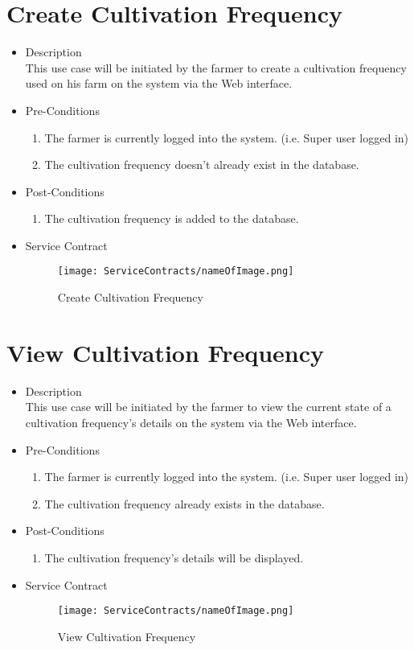\documentclass[11pt,fleqn]{book} %
\begin{document}
\section{Create Cultivation Frequency}
\begin{itemize}
	\item Description\\
	This use case will be initiated by the farmer to create a cultivation frequency used on his farm on the system via the Web interface.
	\item Pre-Conditions
	\begin{enumerate}
		\item The farmer is currently logged into the system. (i.e. Super user logged in)
		\item The cultivation frequency doesn’t already exist in the database. 				
	\end{enumerate}
	\item Post-Conditions
	\begin{enumerate}
		\item The cultivation frequency is added to the database.
	\end{enumerate}
	\item Service Contract
	\begin{figure}
		\texttt{[image: ServiceContracts/nameOfImage.png]}
		\caption{Create Cultivation Frequency}
	\end{figure}
\end{itemize}

\section{View Cultivation Frequency}
\begin{itemize}
	\item Description\\
	This use case will be initiated by the farmer to view the current state of a cultivation frequency’s details on the system via the Web interface.
	\item Pre-Conditions
	\begin{enumerate}
		\item The farmer is currently logged into the system. (i.e. Super user logged in)
		\item The cultivation frequency already exists in the database.		
	\end{enumerate}
	\item Post-Conditions
	\begin{enumerate}
		\item The cultivation frequency’s details will be displayed.
	\end{enumerate}
	\item Service Contract
	\begin{figure}
		\texttt{[image: ServiceContracts/nameOfImage.png]}
		\caption{View Cultivation Frequency}
	\end{figure}
\end{itemize}
\end{document}
